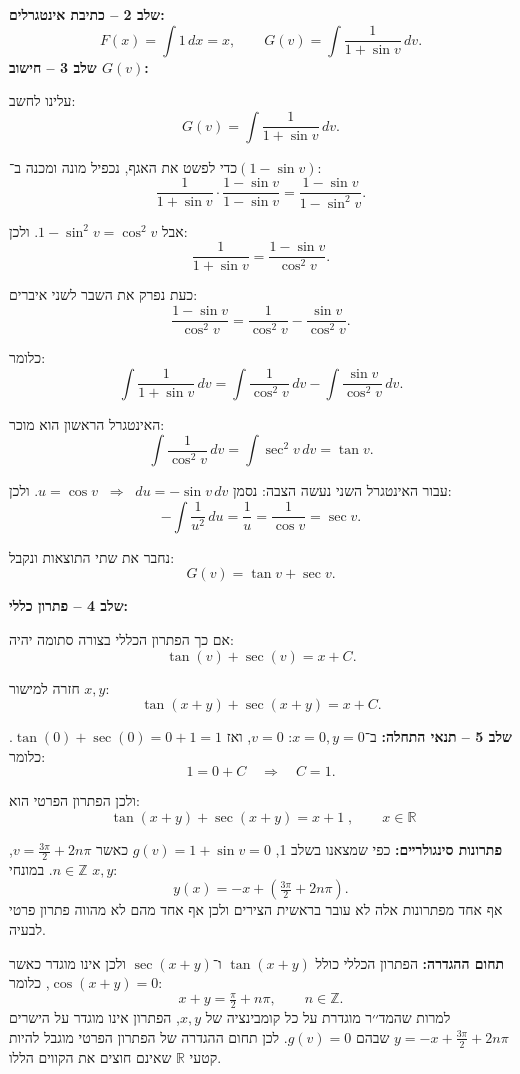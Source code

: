 \documentclass{article}
\numberwithin{equation}{section}
\begin{document}
\textbf{שלב 2 – כתיבת אינטגרלים:}
\[
F(x)=\int 1\,dx = x, 
\qquad
G(v)=\int \frac{1}{1+\sin v}\,dv.
\]
\textbf{שלב 3 – חישוב $G(v)$:}  

עלינו לחשב:
\[
G(v)=\int \frac{1}{1+\sin v}\,dv.
\]

כדי לפשט את האגף, נכפיל מונה ומכנה ב־$(1-\sin v)$:
\[
\frac{1}{1+\sin v}\cdot \frac{1-\sin v}{1-\sin v}
= \frac{1-\sin v}{1-\sin^2 v}.
\]

אבל $1-\sin^2 v=\cos^2 v$.  
ולכן:
\[
\frac{1}{1+\sin v}=\frac{1-\sin v}{\cos^2 v}.
\]

כעת נפרק את השבר לשני איברים:
\[
\frac{1-\sin v}{\cos^2 v}=\frac{1}{\cos^2 v}-\frac{\sin v}{\cos^2 v}.
\]

כלומר:
\[
\int \frac{1}{1+\sin v}\,dv = \int \frac{1}{\cos^2 v}\,dv - \int \frac{\sin v}{\cos^2 v}\,dv.
\]

האינטגרל הראשון הוא מוכר:
\[
\int \frac{1}{\cos^2 v}\,dv = \int \sec^2 v\,dv = \tan v.
\]

עבור האינטגרל השני נעשה הצבה:  
נסמן $u=\cos v \;\;\Rightarrow\;\; du=-\sin v\,dv$.  
ולכן:
\[
-\int \frac{1}{u^2}\,du = \frac{1}{u} = \frac{1}{\cos v} = \sec v.
\]

נחבר את שתי התוצאות ונקבל:
\[
G(v)=\tan v + \sec v.
\]

\textbf{שלב 4 – פתרון כללי:}  

אם כך הפתרון הכללי בצורה סתומה יהיה:
\[
\tan(v)+\sec(v)=x+C.
\]

חזרה למישור $x,y$:  
\[
\tan(x+y)+\sec(x+y)=x+C.
\]

\textbf{שלב 5 – תנאי התחלה:}  
ב־$x=0,y=0$: $v=0$, ואז $\tan(0)+\sec(0)=0+1=1$.  
כלומר:
\[
1=0+C \quad \Rightarrow \quad C=1.
\]

ולכן הפתרון הפרטי הוא:
\[
\boxed{\;\tan(x+y)+\sec(x+y)=x+1\;, \qquad x\in\mathbb{R}}
\]

\textbf{פתרונות סינגולריים:}  
כפי שמצאנו בשלב 1, $g(v)=1+\sin v=0$ כאשר $v=\tfrac{3\pi}{2}+2n\pi$, $n\in\mathbb{Z}$.  
במונחי $x,y$: 
\[
y(x)=-x+\left(\tfrac{3\pi}{2}+2n\pi\right).
\]
אף אחד מפתרונות אלה לא עובר בראשית הצירים ולכן אף אחד מהם לא מהווה פתרון פרטי לבעיה.

\textbf{תחום ההגדרה:}  
הפתרון הכללי כולל $\tan(x+y)$ ו־$\sec(x+y)$ ולכן אינו מוגדר כאשר $\cos(x+y)=0$, כלומר:
\[
x+y=\tfrac{\pi}{2}+n\pi, \qquad n\in\mathbb{Z}.
\]
למרות שהמד׳׳ר מוגדרת על כל קומבינציה של $x,y$, הפתרון אינו מוגדר על הישרים $y=-x+\tfrac{3\pi}{2}+2n\pi$ שבהם $g(v)=0$.  
לכן תחום ההגדרה של הפתרון הפרטי מוגבל להיות קטעי $\mathbb{R}$ שאינם חוצים את הקווים הללו.
\end{document}
